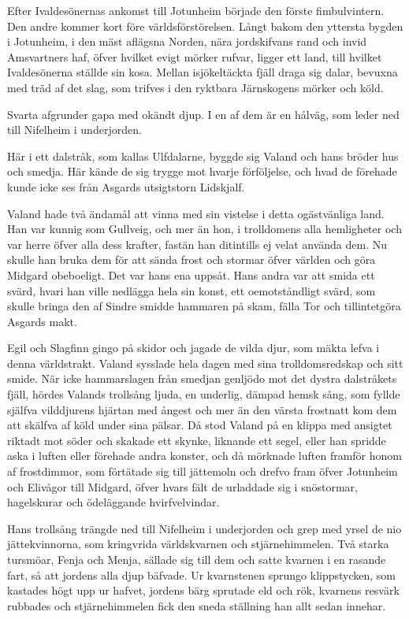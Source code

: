 
Efter Ivaldesönernas ankomst till Jotunheim började den förste
fimbulvintern. Den andre kommer kort före världsförstörelsen. Långt
bakom den yttersta bygden i Jotunheim, i den mäst aflägsna Norden, nära
jordskifvans rand och invid Amsvartners haf, öfver hvilket evigt mörker
rufvar, ligger ett land, till hvilket Ivaldesönerna ställde sin kosa.
Mellan isjökeltäckta fjäll draga sig dalar, bevuxna med träd af det
slag, som trifves i den ryktbara Järnskogens mörker och köld.

Svarta afgrunder gapa med okändt djup. I en af dem är en hålväg, som
leder ned till Nifelheim i underjorden.

Här i ett dalstråk, som kallas Ulfdalarne, byggde sig Valand och hans
bröder hus och smedja. Här kände de sig trygge mot hvarje förföljelse,
och hvad de förehade kunde icke ses från Asgards utsigtstorn Lidskjalf.

Valand hade två ändamål att vinna med sin vistelse i detta ogästvänliga
land. Han var kunnig som Gullveig, och mer än hon, i trolldomens alla
hemligheter och var herre öfver alla dess krafter, fastän han ditintills
ej velat använda dem. Nu skulle han bruka dem för att sända frost och
stormar öfver världen och göra Midgard obeboeligt. Det var hans ena
uppsåt. Hans andra var att smida ett svärd, hvari han ville nedlägga
hela sin konst, ett oemotståndligt svärd, som skulle bringa den af
Sindre smidde hammaren på skam, fälla Tor och tillintetgöra Asgards
makt.

Egil och Slagfinn gingo på skidor och jagade de vilda djur, som mäkta
lefva i denna världstrakt. Valand sysslade hela dagen med sina
trolldomsredskap och sitt smide. När icke hammarslagen från smedjan
genljödo mot det dystra dalstråkets fjäll, hördes Valands trollsång
ljuda, en underlig, dämpad hemsk sång, som fyllde själfva vilddjurens
hjärtan med ångest och mer än den värsta frostnatt kom dem att skälfva
af köld under sina pälsar. Då stod Valand på en klippa med ansigtet
riktadt mot söder och skakade ett skynke, liknande ett segel, eller han
spridde aska i luften eller förehade andra konster, och då mörknade
luften framför honom af frostdimmor, som förtätade sig till jättemoln
och drefvo fram öfver Jotunheim och Elivågor till Midgard, öfver hvars
fält de urladdade sig i snöstormar, hagelskurar och ödeläggande
hvirfvelvindar.

Hans trollsång trängde ned till Nifelheim i underjorden och grep med
yrsel de nio jättekvinnorna, som kringvrida världskvarnen och
stjärnehimmelen. Två starka tursmöar, Fenja och Menja, sällade sig till
dem och satte kvarnen i en rasande fart, så att jordens alla djup
bäfvade. Ur
kvarnstenen
sprungo klippstycken, som kastades högt upp ur hafvet, jordens bärg
sprutade eld och rök, kvarnens resvärk rubbades och stjärnehimmelen fick
den sneda ställning han allt sedan innehar.

